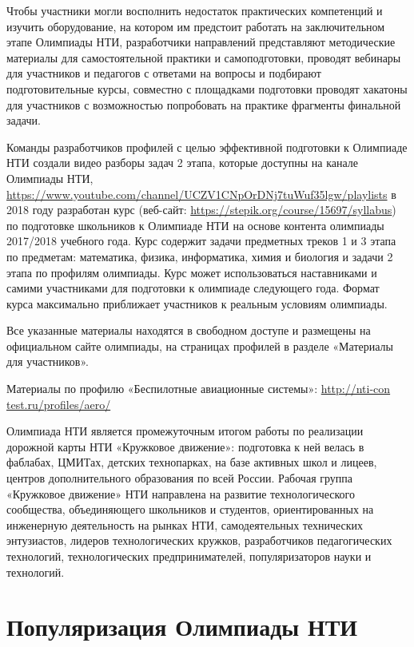 Чтобы участники могли восполнить недостаток практических компетенций и изучить оборудование, на котором им предстоит работать на заключительном этапе Олимпиады НТИ, разработчики направлений представляют методические материалы для самостоятельной практики и самоподготовки, проводят вебинары для участников и педагогов с ответами на вопросы и подбирают подготовительные курсы, совместно с площадками подготовки проводят хакатоны для участников с возможностью попробовать на практике фрагменты финальной задачи. 

Команды разработчиков профилей с целью эффективной подготовки к Олимпиаде НТИ создали видео разборы задач 2 этапа, которые доступны на канале Олимпиады НТИ, \url{https://www.youtube.com/channel/UCZV1CNpOrDNj7tuWuf35lgw/playlists} в 2018 году разработан курс (веб-сайт: \url{https://stepik.org/course/15697/syllabus}) по подготовке школьников к Олимпиаде НТИ на основе контента олимпиады 2017/2018 учебного года. Курс содержит задачи предметных треков 1 и 3 этапа по предметам: математика, физика, информатика, химия и биология и задачи 2 этапа по профилям олимпиады. Курс может использоваться наставниками и самими участниками для подготовки к олимпиаде следующего года. Формат курса максимально приближает участников к реальным условиям олимпиады.

Все указанные материалы находятся в свободном доступе и размещены на официальном сайте олимпиады, на страницах профилей в разделе «Материалы для участников». 

Материалы по профилю «Беспилотные авиационные системы»: \url{http://nti-con} \linebreak \url{test.ru/profiles/aero/}

Олимпиада НТИ является промежуточным итогом работы по реализации дорожной карты НТИ «Кружковое движение»: подготовка к ней велась в фаблабах, ЦМИТах, детских технопарках, на базе активных школ и лицеев, центров дополнительного образования по всей России. Рабочая группа «Кружковое движение» НТИ направлена на развитие технологического сообщества, объединяющего школьников и студентов, ориентированных на инженерную деятельность на рынках НТИ, самодеятельных технических энтузиастов, лидеров технологических кружков, разработчиков педагогических технологий, технологических предпринимателей, популяризаторов науки и технологий.

\section*{Популяризация Олимпиады НТИ}

